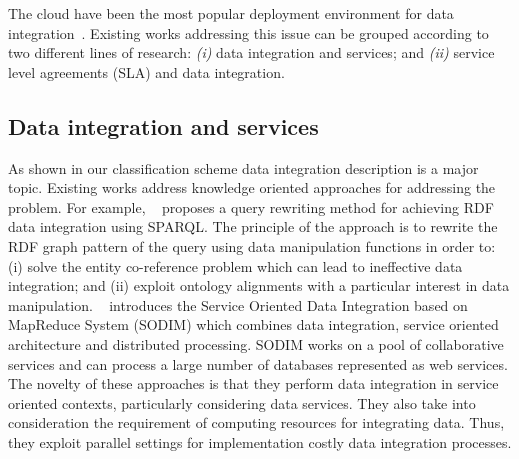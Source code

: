 The cloud have been the most popular deployment environment for data integration~\cite{Carvalho2015}. Existing works addressing this issue can be grouped according to two different lines of research:
\textit{(i)} data integration and services; and
\textit{(ii)} service level agreements (SLA) and data integration. 


\subsection{Data integration and services}

As shown in our classification scheme data integration description is a major topic.  Existing works address knowledge oriented approaches for addressing the problem. For example, ~\cite{075} proposes a  query rewriting method for achieving RDF data integration
using SPARQL. The principle of the approach is to rewrite the RDF graph pattern of the query using data manipulation functions in order to: (i) solve 
the entity co-reference problem which can lead to ineffective data integration; 
and (ii) exploit ontology alignments with a particular interest in data manipulation. 
~\cite{078} introduces the  Service 
Oriented Data Integration based on MapReduce  System (SODIM)  which combines data integration,
service oriented architecture and distributed processing. SODIM works on a pool of collaborative services and can 
process a large number of databases represented as web services. 
The novelty of these approaches is that they perform data integration in service oriented contexts, particularly considering data services. They also take into consideration the requirement of computing resources for integrating data. Thus, they exploit parallel settings for implementation costly data integration processes. 


